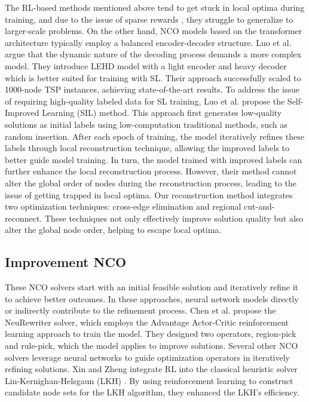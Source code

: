 The RL-based methods mentioned above tend to get stuck in local optima during training, and due to the issue of sparse rewards \cite{bengio2021machine, min2024unsupervised,xia2024position}, they struggle to generalize to larger-scale problems. 
On the other hand, NCO models based on the transformer architecture typically employ a balanced encoder-decoder structure. Luo et al. \cite{luo2023neural} argue that the dynamic nature of the decoding process demands a more complex model. They introduce LEHD model with a light encoder and heavy decoder which is better suited for training with SL. Their approach successfully scaled to 1000-node TSP instances, achieving state-of-the-art results.
To address the issue of requiring high-quality labeled data for SL training, Luo et al. \cite{luo2024self} propose the Self-Improved Learning (SIL) method. This approach first generates low-quality solutions as initial labels using low-computation traditional methods, such as random insertion. After each epoch of training, the model iteratively refines these labels through local reconstruction technique, allowing the improved labels to better guide model training. In turn, the model trained with improved labels can further enhance the local reconstruction process. However, their method cannot alter the global order of nodes during the reconstruction process, leading to the issue of getting trapped in local optima. 
Our reconstruction method integrates two optimization techniques: cross-edge elimination and regional cut-and-reconnect. These techniques not only effectively improve solution quality but also alter the global node order, helping to escape local optima.

\subsection{Improvement NCO}
These NCO solvers start with an initial feasible solution and iteratively refine it to achieve better outcomes. In these approaches, neural network models directly or indirectly contribute to the refinement process.
Chen et al. \cite{chen2019learning} propose the NeuRewriter solver, which employs the Advantage Actor-Critic reinforcement learning approach to train the model. They designed two operators, region-pick and rule-pick, which the model applies to improve solutions. 
Several other NCO solvers \cite{d2020learning,kim2021learning,hudson2021graph} leverage neural networks to guide optimization operators in iteratively refining solutions. 
Xin \cite{xin2021neurolkh} and Zheng \cite{zheng2023reinforced} integrate RL into the classical heuristic solver Lin-Kernighan-Helsgaun (LKH) \cite{helsgaun2000effective,helsgaun2009general}. By using reinforcement learning to construct candidate node sets for the LKH algorithm, they enhanced the LKH's efficiency.


